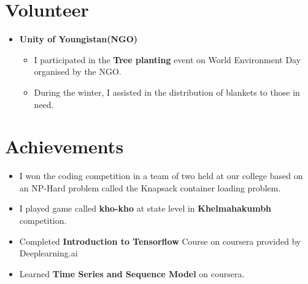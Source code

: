 \documentclass[letterpaper,11pt]{article}
\newcommand{\resumeSubHeadingListStart}{\begin{itemize}[leftmargin=*]}
\newcommand{\resumeSubHeadingListEnd}{\end{itemize}}
\begin{document}
\section{Volunteer}
\resumeSubHeadingListStart
\item {\bf Unity of Youngistan(NGO)} \href{https://instagram.com/youngistan_official?utm_medium=copy_link}{\faExternalLink}
	\begin{itemize}
\item I participated in the {\bf Tree planting} event on World Environment Day organised by the NGO.
\item During the winter, I assisted in the distribution of blankets to those in need.
	\end{itemize}
\resumeSubHeadingListEnd

\section{Achievements}
\resumeSubHeadingListStart
\item I won the coding competition in a team of two held at our college based on an NP-Hard problem called the Knapsack container loading problem.
\item I played game called {\bf kho-kho} at state level in {\bf Khelmahakumbh} competition.
\item Completed {\bf Introduction to Tensorflow} Course on coursera provided by Deeplearning.ai
\item Learned {\bf Time Series and Sequence Model} on coursera.
\resumeSubHeadingListEnd
\end{document}
